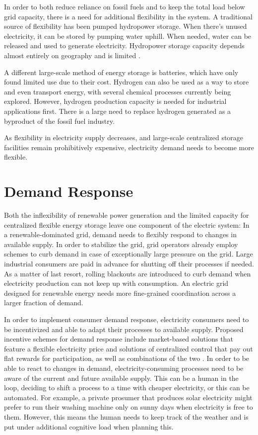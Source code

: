 In order to both reduce reliance on fossil fuels and to keep the total load below grid capacity, there is a need for additional flexibility in the system.
A traditional source of flexibility has been pumped hydropower storage.
When there's unused electricity, it can be stored by pumping water uphill.
When needed, water can be released and used to generate electricity. 
Hydropower storage capacity depends almost entirely on geography and is limited \citep{gimeno-gutierrez2015AssessmentEuropeanPotential}.

A different large-scale method of energy storage is batteries, which have only found limited use due to their cost.
Hydrogen can also be used as a way to store and even transport energy, with several chemical processes currently being explored.
However, hydrogen production capacity is needed for industrial applications first.
There is a large need to replace hydrogen generated as a byproduct of the fossil fuel industry.

As flexibility in electricity supply decreases, and large-scale centralized storage facilities remain prohibitively expensive, electricity demand needs to become more flexible.

\section{Demand Response}
Both the inflexibility of renewable power generation and the limited capacity for centralized flexible energy storage leave one component of the electric system: In a renewable-dominated grid, demand needs to flexibly respond to changes in available supply.
In order to stabilize the grid, grid operators already employ schemes to curb demand in case of exceptionally large pressure on the grid.
Large industrial consumers are paid in advance for shutting off their processes if needed.
As a matter of last resort, rolling blackouts are introduced to curb demand when electricity production can not keep up with consumption.
An electric grid designed for renewable energy needs more fine-grained coordination across a larger fraction of demand.

In order to implement consumer demand response, electricity consumers need to be incentivized and able to adapt their processes to available supply.
Proposed incentive schemes for demand response include market-based solutions that feature a flexible electricity price and solutions of centralized control that pay out flat rewards for participation, as well as combinations of the two \citep{khajavi2011RoleIncentiveBased}.
In order to be able to react to changes in demand, electricity-consuming processes need to be aware of the current and future available supply.
This can be a human in the loop, deciding to shift a process to a time with cheaper electricity, or this can be automated.
For example, a private prosumer that produces solar electricity might prefer to run their washing machine only on sunny days when electricity is free to them.
However, this means the human needs to keep track of the weather and is put under additional cognitive load when planning this.

